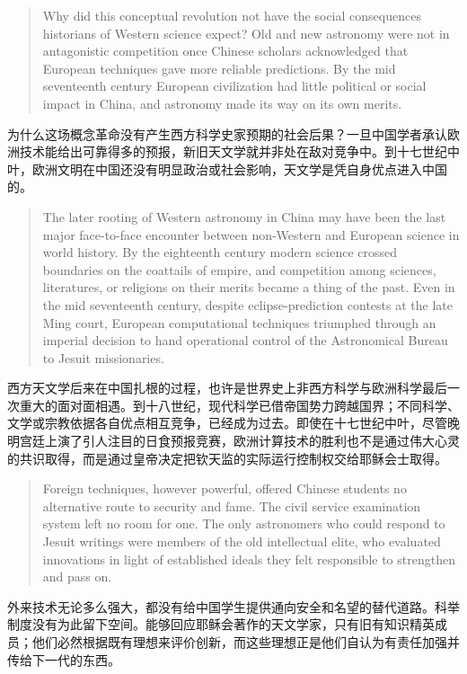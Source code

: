 \documentclass[UTF8,zihao=-4]{ctexart}
\newenvironment{enblock}
  {\par\smallskip\noindent{\scriptsize\bfseries English}\par\begin{quote}\small}
  {\end{quote}}
\newenvironment{zhblock}
  {\par\noindent{\scriptsize\bfseries 中文}\par}
  {\par\medskip}
\begin{document}
\begin{enblock}
Why did this conceptual revolution not have the social consequences historians of Western science expect? Old and new astronomy were not in antagonistic competition once Chinese scholars acknowledged that European techniques gave more reliable predictions. By the mid seventeenth century European civilization had little political or social impact in China, and astronomy made its way on its own merits.
\end{enblock}
\begin{zhblock}
为什么这场概念革命没有产生西方科学史家预期的社会后果？一旦中国学者承认欧洲技术能给出可靠得多的预报，新旧天文学就并非处在敌对竞争中。到十七世纪中叶，欧洲文明在中国还没有明显政治或社会影响，天文学是凭自身优点进入中国的。
\end{zhblock}

\begin{enblock}
The later rooting of Western astronomy in China may have been the last major face-to-face encounter between non-Western and European science in world history. By the eighteenth century modern science crossed boundaries on the coattails of empire, and competition among sciences, literatures, or religions on their merits became a thing of the past. Even in the mid seventeenth century, despite eclipse-prediction contests at the late Ming court, European computational techniques triumphed through an imperial decision to hand operational control of the Astronomical Bureau to Jesuit missionaries.
\end{enblock}
\begin{zhblock}
西方天文学后来在中国扎根的过程，也许是世界史上非西方科学与欧洲科学最后一次重大的面对面相遇。到十八世纪，现代科学已借帝国势力跨越国界；不同科学、文学或宗教依据各自优点相互竞争，已经成为过去。即使在十七世纪中叶，尽管晚明宫廷上演了引人注目的日食预报竞赛，欧洲计算技术的胜利也不是通过伟大心灵的共识取得，而是通过皇帝决定把钦天监的实际运行控制权交给耶稣会士取得。
\end{zhblock}

\begin{enblock}
Foreign techniques, however powerful, offered Chinese students no alternative route to security and fame. The civil service examination system left no room for one. The only astronomers who could respond to Jesuit writings were members of the old intellectual elite, who evaluated innovations in light of established ideals they felt responsible to strengthen and pass on.
\end{enblock}
\begin{zhblock}
外来技术无论多么强大，都没有给中国学生提供通向安全和名望的替代道路。科举制度没有为此留下空间。能够回应耶稣会著作的天文学家，只有旧有知识精英成员；他们必然根据既有理想来评价创新，而这些理想正是他们自认为有责任加强并传给下一代的东西。
\end{zhblock}
\end{document}
